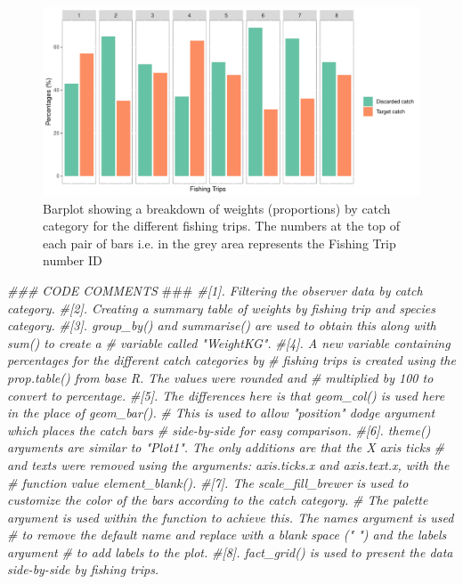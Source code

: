 \documentclass[
]{book}
\newenvironment{Shaded}{\begin{snugshade}}{\end{snugshade}}
\newcommand{\AlertTok}[1]{\textcolor[rgb]{0.94,0.16,0.16}{#1}}
\newcommand{\CommentTok}[1]{\textcolor[rgb]{0.56,0.35,0.01}{\textit{#1}}}
\begin{document}
\begin{figure}

{\centering \includegraphics{bookdown-demo_files/figure-latex/unnamed-chunk-6-1} 

}

\caption{Barplot showing a breakdown of weights (proportions) by catch category for the different fishing trips. The numbers at the top of each pair of bars i.e. in the grey area represents the Fishing Trip number ID}\label{fig:unnamed-chunk-6}
\end{figure}

\begin{Shaded}
\begin{Highlighting}[]
\CommentTok{### CODE COMMENTS }\AlertTok{###}
\CommentTok{#[1]. Filtering the observer data by catch category.}
\CommentTok{#[2]. Creating a summary table of weights by fishing trip and species category.}
\CommentTok{#[3]. group_by() and summarise() are used to obtain this along with sum() to create a }
\CommentTok{#     variable called "WeightKG". }
\CommentTok{#[4]. A new variable containing percentages for the different catch categories by }
\CommentTok{#     fishing trips is created using the prop.table() from base R. The values were rounded and }
\CommentTok{#     multiplied by 100 to convert to percentage. }
\CommentTok{#[5]. The differences here is that geom_col() is used here in the place of geom_bar().}
\CommentTok{#     This is used to allow "position" dodge argument which places the catch bars }
\CommentTok{#     side-by-side for easy comparison.}
\CommentTok{#[6]. theme() arguments are similar to "Plot1". The only additions are that the X axis ticks }
\CommentTok{#     and texts were removed using the arguments: axis.ticks.x and axis.text.x, with the }
\CommentTok{#     function value element_blank().}
\CommentTok{#[7]. The scale_fill_brewer is used to customize the color of  the bars according to the catch category.}
\CommentTok{#     The palette argument is used within the function to achieve this. The names argument is used}
\CommentTok{#     to remove the default name and replace with a blank space (" ") and the labels argument }
\CommentTok{#     to add labels to the plot.}
\CommentTok{#[8]. fact_grid() is used to present the data side-by-side by fishing trips. }
\end{Highlighting}
\end{Shaded}
\end{document}

